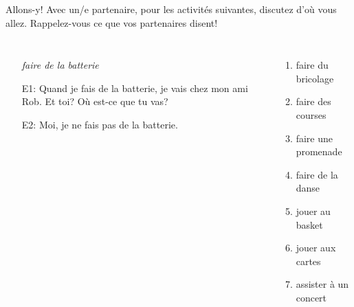 \begin{frame}{Allons-y!}
  Avec un/e partenaire, pour les activités suivantes, discutez d'où vous allez.
  Rappelez-vous ce que vos partenaires disent! \\
  \begin{columns}
      \begin{itemize}
        \item[] \emph{faire de la batterie}
        \item[E1:] Quand je fais de la batterie, \alert{je vais} chez mon ami Rob. Et toi? Où est-ce que tu vas?
        \item[E2:] Moi, je ne fais pas de la batterie.
      \end{itemize}
      \begin{enumerate}
        \item faire du bricolage
        \item faire des courses
        \item faire une promenade
        \item faire de la danse
        \item jouer au basket
        \item jouer aux cartes
        \item assister à un concert
      \end{enumerate}
  \end{columns}
\end{frame}